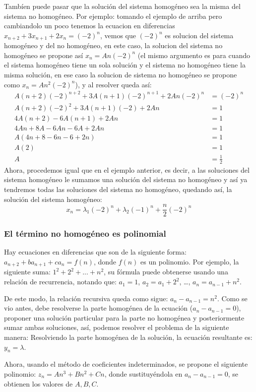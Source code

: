 \documentclass{article}
\begin{document}
Tambíen puede pasar que la solución del sistema homogéneo sea la misma del sistema no homogéneo. Por ejemplo: tomando el ejemplo de arriba pero cambiandolo un poco tenemos la ecuacion en diferencias $x_{n+2}+3x_{n+1}+2x_n=(-2)^n$, vemos que $(-2)^n$ es solucion del sistema homogéneo y del no homogéneo, en este caso, la solucion del sistema no homogéneo se propone así $x_n=An(-2)^n$ (el mismo argumento es para cuando el sistema homogéneo tiene un sola solución y el sistema no homogéneo tiene la misma solución, en ese caso la solucion de sistema no homogéneo se propone como $x_n=An^2(-2)^n$), y al resolver queda así:
\begin{align*}
  A(n+2)(-2)^{n+2}+3A(n+1)(-2)^{n+1}+2An(-2)^n&=(-2)^n\\
  A(n+2)(-2)^2+3A(n+1)(-2)+2An&=1\\
  4A(n+2)-6A(n+1)+2An&=1\\
  4An+8A-6An-6A+2An&=1\\
  A(4n+8-6n-6+2n)&=1\\
  A(2)&=1\\
  A&=\frac{1}{2}
\end{align*}
Ahora, procedemos igual que en el ejemplo anterior, es decir, a las soluciones del sistema homogéneo le sumamos una solución del sistema no homogéneo y así ya tendremos todas las soluciones del sistema no homogéneo, quedando así, la solución del sistema homogéneo:
$$x_n=\lambda_1(-2)^n+\lambda_2(-1)^n+\frac{n}{2}(-2)^n$$
\subsubsection{El término no homogéneo es polinomial}
\label{sec:polinomial}

Hay ecuaciones en diferencias que son de la siguiente forma: $a_{n+2}+ba_{n+1}+ca_n=f(n)$, donde $f(n)$ es un polinomio. Por ejemplo, la siguiente suma: $1^2+2^2+...+n^2$, su fórmula puede obtenerse usando una relación de recurrencia, notando que:
$a_1=1$, $a_2=a_1+2^2$, \dots, $a_n=a_{n-1}+n^2$.


De este modo, la relación recursiva queda como sigue:
$a_{n}-a_{n-1}=n^2$.  Como se vio antes, debe resolverse la parte
homogénea de la ecuación ($a_n-a_{n-1}=0$), proponer una solución
particular para la parte no homogénea y posteriormente sumar ambas
soluciones, así, podemos resolver el problema de la siguiente manera:
Resolviendo la parte homogénea de la solución, la ecuación resultante
es: $y_n=\lambda$.

Ahora, usando el método de coeficientes indeterminados, se propone el
siguiente polinomio: $z_n=An^3+Bn^2+Cn$, donde sustituyéndola en
$a_n-a_{n-1}=0$, se obtienen los valores de $A,B,C$.
\end{document}

